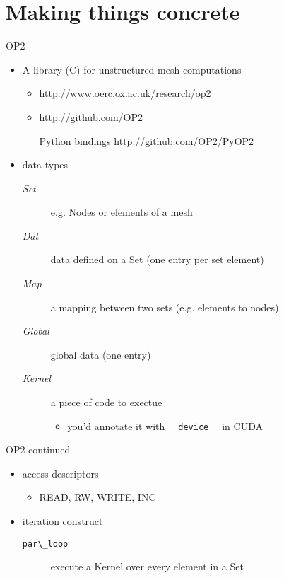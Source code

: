 \documentclass[bigger]{beamer}
\begin{document}
\section{Making things concrete}
\label{sec:orgheadline13}
\begin{frame}[fragile,label={sec:orgheadline8}]{OP2}
 \begin{itemize}
\item A library (C) for unstructured mesh computations
\begin{itemize}
\item \url{http://www.oerc.ox.ac.uk/research/op2}
\item \url{http://github.com/OP2}
\item[{Python bindings}] \url{http://github.com/OP2/PyOP2}
\end{itemize}
\item data types
\begin{description}
\item[{\emph{Set}}] e.g. Nodes or elements of a mesh
\item[{\emph{Dat}}] data defined on a Set (one entry per set element)
\item[{\emph{Map}}] a mapping between two sets (e.g. elements to nodes)
\item[{\emph{Global}}] global data (one entry)
\item[{\emph{Kernel}}] a piece of code to exectue
\begin{itemize}
\item you'd annotate it with \texttt{\_\_device\_\_} in CUDA
\end{itemize}
\end{description}
\end{itemize}
\end{frame}

\begin{frame}[label={sec:orgheadline9}]{OP2 continued}
\begin{itemize}
\item access descriptors
\begin{itemize}
\item READ, RW, WRITE, INC
\end{itemize}
\item iteration construct
\begin{description}
\item[\verb~par\_loop~] execute a Kernel over every element in a Set
\end{description}
\end{itemize}
\end{frame}
\end{document}
